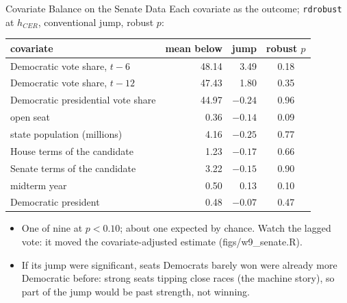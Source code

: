 \documentclass[aspectratio=169,11pt,xcolor=dvipsnames]{beamer}
\newcommand{\srcp}[1]{{\scriptsize\color{gray}(#1)}}
\begin{document}
\begin{frame}{Covariate Balance on the Senate Data}
Each covariate as the outcome; \texttt{rdrobust} at $h_{CER}$, conventional jump, robust $p$:
\vskip-2pt
\begin{center}\footnotesize
\renewcommand{\arraystretch}{1.0}
\begin{tabular}{@{}lrrc@{}}
\toprule
covariate & mean below & jump & robust $p$ \\
\midrule
Democratic vote share, $t-6$ & 48.14 & 3.49 & 0.18 \\
Democratic vote share, $t-12$ & 47.43 & 1.80 & 0.35 \\
Democratic presidential vote share & 44.97 & $-0.24$ & 0.96 \\
open seat & 0.36 & $-0.14$ & 0.09 \\
state population (millions) & 4.16 & $-0.25$ & 0.77 \\
House terms of the candidate & 1.23 & $-0.17$ & 0.66 \\
Senate terms of the candidate & 3.22 & $-0.15$ & 0.90 \\
midterm year & 0.50 & 0.13 & 0.10 \\
Democratic president & 0.48 & $-0.07$ & 0.47 \\
\bottomrule
\end{tabular}
\end{center}
\vskip2pt
\begin{itemize}\itemsep1pt\small
  \item One of nine at $p < 0.10$; about one expected by chance. Watch the lagged
        vote: it moved the covariate-adjusted estimate \srcp{figs/w9\_senate.R}.
  \item If its jump were significant, seats Democrats barely won were already more
        Democratic before: strong seats tipping close races (the machine story), so
        part of the jump would be past strength, not winning.
\end{itemize}
\end{frame}
\end{document}
